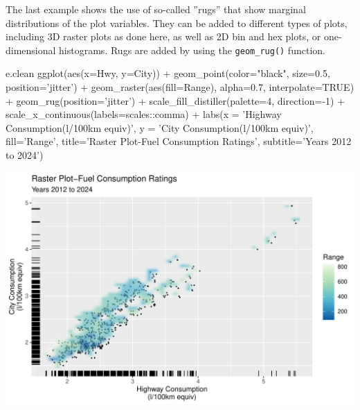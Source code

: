 The last example shows the use of so-called ''rugs'' that show marginal distributions of the plot variables. They can be added to different types of plots, including 3D raster plots as done here, as well as 2D bin and hex plots, or one-dimensional histograms. Rugs are added by using the \texttt{geom\_rug()} function.

\begin{samepage}
\begin{Rcode}
e.clean %
  ggplot(aes(x=Hwy, y=City)) + 
    geom_point(color="black", size=0.5, 
               position='jitter') +
    geom_raster(aes(fill=Range), alpha=0.7, 
                interpolate=TRUE) + 
    geom_rug(position='jitter') + 
    scale_fill_distiller(palette=4, direction=-1) +
    scale_x_continuous(labels=scales::comma) +
    labs(x = 'Highway Consumption\n(l/100km equiv)', 
         y = 'City Consumption\n(l/100km equiv)', 
         fill='Range', 
         title='Raster Plot-Fuel Consumption Ratings', 
         subtitle='Years 2012 to 2024') 
\end{Rcode}
\end{samepage}

\begin{center}
  \includegraphics[width=.8\textwidth]{fuel.raster.rug.pdf}
\end{center}

